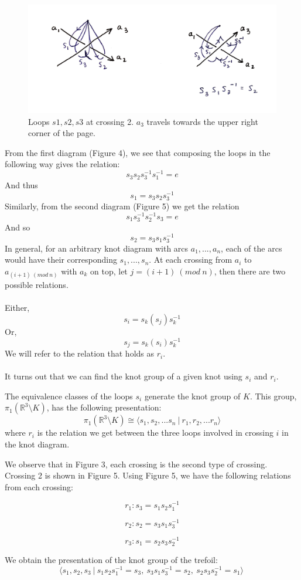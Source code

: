 \documentclass{article}
\begin{document}
\begin{definition}
	\begin{figure}[h!]
		\centering
		\captionsetup{width=.75\linewidth}
		\includegraphics[width=6in]{figures/loops_s2.png}
		\caption{Loops $s1, s2, s3$ at crossing 2. $a_3$ travels towards the upper right corner of the page.}
		\label{fig:rtinstability}
	\end{figure}
\end{definition}	
	
\noindent From the first diagram (Figure 4), we see that composing the loops in the following way gives the relation:
\[s_3s_2s_3^{-1}s_1^{-1} = e\]
And thus
\[s_1 = s_3s_2s_3^{-1}\]
\noindent Similarly, from the second diagram (Figure 5) we get the relation
\[s_1s_3^{-1}s_2^{-1}s_3 = e\]
And so
\[s_2 = s_3s_1s_3^{-1}\]
\noindent In general, for an arbitrary knot diagram with arcs $a_1, ..., a_n$, each of the arcs would have their corresponding $s_1, ..., s_n$. At each crossing from $a_i$ to $a_{(i + 1)\ (mod\ n)}$ with $a_k$ on top, let $j = (i + 1)\ (mod\ n)$, then there are two possible relations.\\\\
Either,
\[s_i = s_k(s_{j})s_k^{-1}\]
Or,
\[s_{j} = s_k(s_i)s_k^{-1}\]
We will refer to the relation that holds as $r_i$.\\\\
It turns out that we can find the knot group of a given knot using $s_i$ and $r_i$.

\begin{claim}
The equivalence classes of the loops $s_i$ generate the knot group of $K$. This group, $\pi_1(\mathbb{R}^3\setminus K)$, has the following presentation:
\[ \pi_1(\mathbb{R}^3\setminus K) \cong \langle s_1,s_2,...s_n\ |\ r_1,r_2,...r_n \rangle\] 
where $r_i$ is the relation we get between the three loops involved in crossing $i$ in the knot diagram.
\end{claim}

\begin{example}
We observe that in Figure 3, each crossing is the second type of crossing. Crossing 2 is shown in Figure 5. Using Figure 5, we have the following relations from each crossing:

\[r_1: s_3 = s_1s_2s_1^{-1}\]

\[r_2: s_2 = s_3s_1s_3^{-1}\]

\[r_3: s_1 = s_2s_3s_2^{-1}\]

\noindent We obtain the presentation of the knot group of the trefoil:
\[ \langle s_1,s_2,s_3\ |\ s_1s_2s_1^{-1} = s_3,\ s_3s_1s_3^{-1} = s_2,\ s_2s_3s_2^{-1} = s_1\rangle\ \]
\end{example}
\end{document}
